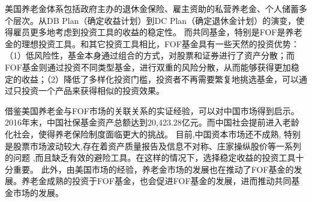 美国养老金体系包括政府主办的退休金保险、雇主资助的私营养老金、个人储蓄多个层次。从DB Plan（确定收益计划）到DC Plan（确定退休金计划）的演变，使得雇员更多地考虑到投资工具的收益的稳定性。
而共同基金，特别是FOF是养老金的理想投资工具。和其它投资工具相比，FOF基金具有一些天然的投资优势：（1）低风险性，基金本身通过组合的方式，对股票和证券进行了资产分散；而FOF基金则通过投资不同类型基金，进行双重的风险分散，从而能够获得更加稳定的收益；（2）降低了多样化投资门槛，投资者不再需要繁复地挑选基金，可以通过只投资一个产品来获得相似的投资效果。

借鉴美国养老金与FOF市场的关联关系的实证经验，可以对中国市场得到启示。2016年末，中国社保基金资产总额达到20,423.28亿元。而中国社会提前进入老龄化社会，使得养老保险制度面临更大的挑战。
目前,中国资本市场还不成熟, 特别是股票市场波动较大,存在着资产质量报告及信息不对称、庄家操纵股价等一系列的问题 ,而且缺乏有效的避险工具。在这样的情况下，选择稳定收益的投资工具十分重要。
此外，由美国市场的经验，养老金市场的发展也在推动了FOF基金的发展。养老金成熟的投资于FOF基金，也会促进FOF基金的发展，进而推动共同基金市场的发展。
